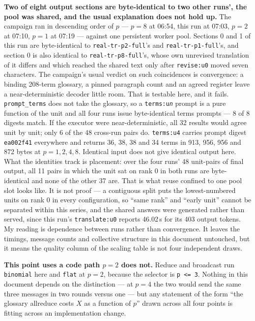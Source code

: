 \documentclass[11pt]{article}
\begin{document}
\textbf{Two of eight output sections are byte-identical to two other runs', the pool was shared,
and the usual explanation does not hold up.} The campaign ran in descending order of $p$ --- $p=8$
at 06:54, this run at 07:03, $p=2$ at 07:10, $p=1$ at 07:19 --- against one persistent worker
pool. Sections 0 and 1 of this run are byte-identical to \texttt{real-tr-p2-full}'s and
\texttt{real-tr-p1-full}'s, and section 0 is also identical to \texttt{real-tr-p8-full}'s, whose
own unrevised translation of it differs and which reached the shared text only after
\texttt{revise:u0} moved seven characters. The campaign's usual verdict on such coincidences is
convergence: a binding 208-term glossary, a pinned paragraph count and an agreed register leave a
near-deterministic decoder little room. That is testable here, and it fails. \texttt{prompt\_terms}
does not take the glossary, so a \texttt{terms:u\emph{n}} prompt is a pure function of the unit
and all four runs issue byte-identical terms prompts --- 8 of 8 digests match. If the executor
were near-deterministic, all 32 results would agree unit by unit; only 6 of the 48 cross-run pairs
do. \texttt{terms:u4} carries prompt digest \texttt{ea002f41} everywhere and returns 36, 38, 38
and 34 terms in 913, 956, 956 and 872 bytes at $p=1,2,4,8$. Identical input does not give
identical output here. What the identities track is placement: over the four runs' 48 unit-pairs
of final output, all 11 pairs in which the unit sat on rank 0 in both runs are byte-identical and
none of the other 37 are. That is what reuse confined to one pool slot looks like. It is not
proof --- a contiguous split puts the lowest-numbered units on rank 0 in every configuration, so
``same rank'' and ``early unit'' cannot be separated within this series, and the shared answers
were generated rather than served, since this run's \texttt{translate:u0} reports 46.02\,s for its
403 output tokens. My reading is dependence between runs rather than convergence. It leaves the
timings, message counts and collective structure in this document untouched, but it means the
quality column of the scaling table is not four independent draws.

\textbf{This point uses a code path $p=2$ does not.} Reduce and broadcast run \texttt{binomial}
here and \texttt{flat} at $p=2$, because the selector is \texttt{p <= 3}. Nothing in this document
depends on the distinction --- at $p=4$ the two would send the same three messages in two rounds
versus one --- but any statement of the form ``the glossary allreduce costs $X$ as a function of
$p$'' drawn across all four points is fitting across an implementation change.
\end{document}
